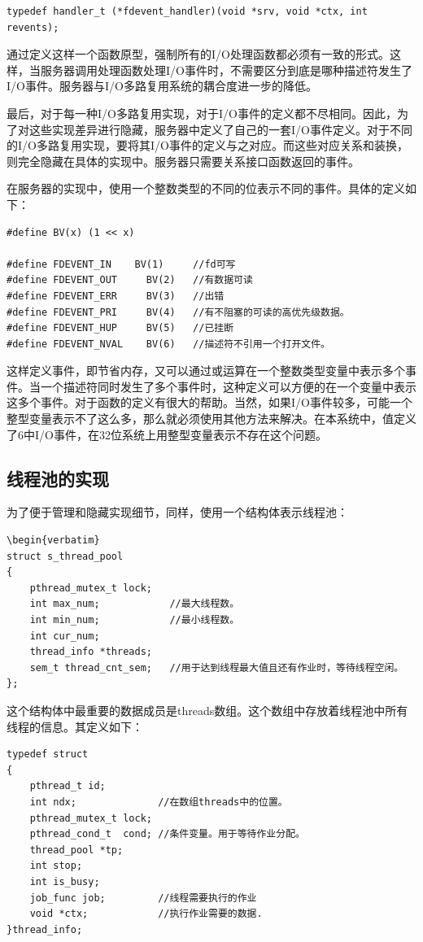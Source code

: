 \documentclass[12pt, twoside, a4paper, xetex]{report}
\begin{document}
\begin{verbatim}	
typedef handler_t (*fdevent_handler)(void *srv, void *ctx, int revents);
\end{verbatim}
	
	通过定义这样一个函数原型，强制所有的I/O处理函数都必须有一致的形式。这样，当服务器调用处理函数处理I/O事件时，不需要区分到底是哪种描述符发生了I/O事件。服务器与I/O多路复用系统的耦合度进一步的降低。
	
	最后，对于每一种I/O多路复用实现，对于I/O事件的定义都不尽相同。因此，为了对这些实现差异进行隐藏，服务器中定义了自己的一套I/O事件定义。对于不同的I/O多路复用实现，要将其I/O事件的定义与之对应。而这些对应关系和装换，则完全隐藏在具体的实现中。服务器只需要关系接口函数返回的事件。
	
	在服务器的实现中，使用一个整数类型的不同的位表示不同的事件。具体的定义如下：
\begin{verbatim}	
#define BV(x) (1 << x)

#define FDEVENT_IN	  BV(1) 	//fd可写
#define FDEVENT_OUT 	BV(2) 	//有数据可读
#define FDEVENT_ERR 	BV(3) 	//出错
#define FDEVENT_PRI 	BV(4) 	//有不阻塞的可读的高优先级数据。
#define FDEVENT_HUP 	BV(5) 	//已挂断
#define FDEVENT_NVAL	BV(6) 	//描述符不引用一个打开文件。
\end{verbatim}
	
	这样定义事件，即节省内存，又可以通过或运算在一个整数类型变量中表示多个事件。当一个描述符同时发生了多个事件时，这种定义可以方便的在一个变量中表示这多个事件。对于函数的定义有很大的帮助。当然，如果I/O事件较多，可能一个整型变量表示不了这么多，那么就必须使用其他方法来解决。在本系统中，值定义了6中I/O事件，在32位系统上用整型变量表示不存在这个问题。
	
\subsection{线程池的实现}
	为了便于管理和隐藏实现细节，同样，使用一个结构体表示线程池：
\begin{verbatim}
\begin{verbatim}
struct s_thread_pool
{
	pthread_mutex_t lock; 
	int max_num;            //最大线程数。
	int min_num;            //最小线程数。
	int cur_num; 
	thread_info *threads;
	sem_t thread_cnt_sem;   //用于达到线程最大值且还有作业时，等待线程空闲。
};
\end{verbatim}
	
	这个结构体中最重要的数据成员是threads数组。这个数组中存放着线程池中所有线程的信息。其定义如下：

\begin{verbatim}	
typedef struct 
{
	pthread_t id; 
	int ndx;              //在数组threads中的位置。
	pthread_mutex_t lock; 
	pthread_cond_t  cond; //条件变量。用于等待作业分配。
	thread_pool *tp;
	int stop;
	int is_busy;
	job_func job;         //线程需要执行的作业
	void *ctx;            //执行作业需要的数据.
}thread_info;
\end{verbatim}
\end{document}
